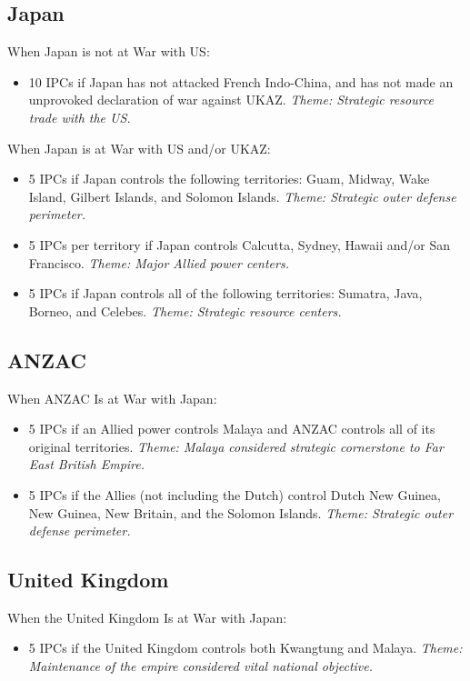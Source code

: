 \documentclass[10pt,twoside]{article}
\begin{document}
\begin{multicols*}{3}
\begin{minipage}{\linewidth}
\subsection*{Japan}
When Japan is not at War with US:
\begin{itemize}
\item 10 IPCs if Japan has not attacked French Indo-China, and has not made an unprovoked declaration of war against UKAZ. \textsl{Theme: Strategic resource trade with the US.}
\end{itemize}
When Japan is at War with US and/or UKAZ:
\begin{itemize}
\item 5 IPCs if Japan controls the following territories: Guam, Midway, Wake Island, Gilbert Islands, and Solomon Islands. \textsl{Theme: Strategic outer defense perimeter.}
\item 5 IPCs per territory if Japan controls Calcutta, Sydney, Hawaii and/or San Francisco. \textsl{Theme: Major Allied power centers.}
\item 5 IPCs if Japan controls all of the following territories: Sumatra, Java, Borneo, and Celebes. \textsl{Theme: Strategic resource centers.}
\end{itemize}

\subsection*{ANZAC}
When ANZAC Is at War with Japan:
\begin{itemize}
\item 5 IPCs if an Allied power controls Malaya and ANZAC controls all of its original territories. \textsl{Theme: Malaya considered strategic cornerstone to Far East British Empire.}
\item 5 IPCs if the Allies (not including the Dutch) control Dutch New Guinea, New Guinea, New Britain, and the Solomon Islands. \textsl{Theme: Strategic outer defense perimeter.}
\end{itemize}
\end{minipage}
\columnbreak

\subsection*{United Kingdom}
When the United Kingdom Is at War with Japan:
\begin{itemize}
\item 5 IPCs if the United Kingdom controls both Kwangtung
and Malaya. \textsl{Theme: Maintenance of the empire considered vital national objective.}
\end{itemize}


\end{multicols*}
\end{document}

